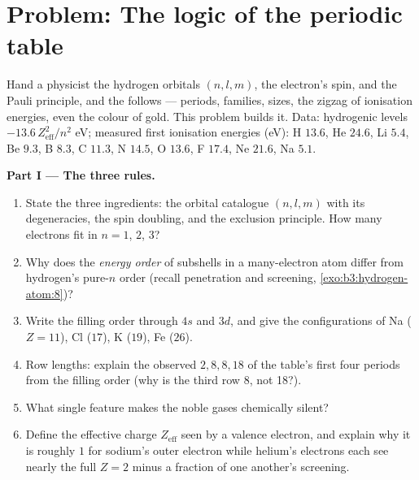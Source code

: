 \section{Problem: The logic of the periodic table}

\begin{problem}\label{pb:b3:identical-particles:1}
Hand a physicist the hydrogen orbitals $(n, l, m)$, the electron's
spin, and the Pauli principle, and the  follows ---
periods, families, sizes, the zigzag of ionisation energies, even
the colour of gold. This problem builds it. Data: hydrogenic
levels $-13.6\,Z_{\text{eff}}^2/n^2$ eV; measured first ionisation
energies (eV): H $13.6$, He $24.6$, Li $5.4$, Be $9.3$, B $8.3$,
C $11.3$, N $14.5$, O $13.6$, F $17.4$, Ne $21.6$, Na $5.1$.

\medskip\noindent\textbf{Part I --- The three rules.}
\begin{enumerate}
  \item State the three ingredients: the orbital catalogue
        $(n, l, m)$ with its degeneracies, the spin doubling, and
        the exclusion principle. How many electrons fit in $n = 1$,
        $2$, $3$?
  \item Why does the \emph{energy order} of subshells in a
        many-electron atom differ from hydrogen's pure-$n$ order
        (recall penetration and screening,
        \cref{exo:b3:hydrogen-atom:8})?
  \item Write the filling order through $4s$ and $3d$, and give
        the configurations of Na ($Z = 11$), Cl ($17$), K ($19$),
        Fe ($26$).
  \item Row lengths: explain the observed $2, 8, 8, 18$ of the
        table's first four periods from the filling order (why is
        the third row 8, not 18?).
  \item What single feature makes the noble gases chemically
        silent?
  \item Define the effective charge $Z_{\text{eff}}$ seen by a
        valence electron, and explain why it is roughly $1$ for
        sodium's outer electron while helium's electrons each see
        nearly the full $Z = 2$ minus a fraction of one another's
        screening.
\end{enumerate}


\end{problem}
